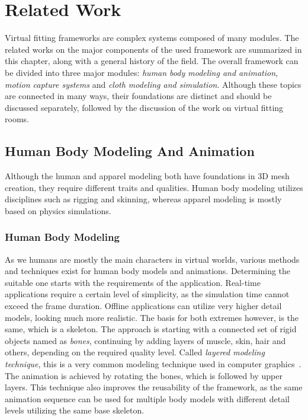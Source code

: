 \chapter{Related Work}
\label{chapter_related_work}

Virtual fitting frameworks are complex systems composed of many modules. The related works on the major components of the used framework are summarized in this chapter, along with a general history of the field. 
The overall framework can be divided into three major modules: \textit{human body modeling and animation}, \textit{motion capture systems} and \textit{cloth modeling and simulation}. Although these topics are connected in many ways, their foundations are distinct and should be discussed separately, followed by the discussion of the work on virtual fitting rooms.

\section{Human Body Modeling And Animation}
\label{section_related_modeling}

Although the human and apparel modeling both have foundations in 3D mesh creation, they require different traits and qualities. Human body modeling utilizes disciplines such as rigging and skinning, whereas apparel modeling is mostly based on physics simulations.

\subsection{Human Body Modeling}
As we humans are mostly the main characters in virtual worlds, various methods and techniques exist for human body models and animations. Determining the suitable one starts with the requirements of the application. Real-time applications require a certain level of simplicity, as the simulation time cannot exceed the frame duration. Offline applications can utilize very higher detail models, looking much more realistic. The basis for both extremes however, is the same, which is a skeleton. The approach is starting with a connected set of rigid objects named as \textit{bones}, continuing by adding layers of muscle, skin, hair and others, depending on the required quality level. Called \textit{layered modeling technique}, this is a very common modeling technique used in computer graphics~\cite{Chadwick1989}. The animation is achieved by rotating the bones, which is followed by upper layers. This technique also improves the reusability of the framework, as the same animation sequence can be used for multiple body models with different detail levels utilizing the same base skeleton.   

